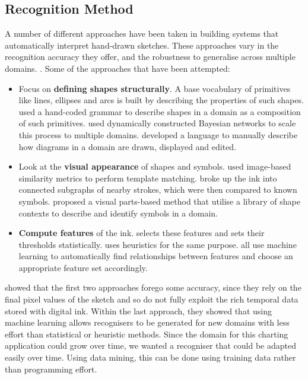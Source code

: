 	\subsection{Recognition Method}
	A number of different approaches have been taken in building systems that automatically interpret hand-drawn sketches. These approaches vary in the recognition accuracy they offer, and the robustness to generalise across multiple domains. \citep{ouyang_visual_2009}. Some of the approaches that have been attempted:
	
	\begin{itemize}
		\item Focus on \textbf{defining shapes structurally}. A base vocabulary of primitives like lines, ellipses and arcs is built by describing the properties of such shapes. \citep{shilman_statistical_2002} used a hand-coded grammar to describe shapes in a domain as a composition of such primitives. \citep{alvarado_sketchread:_2004} used dynamically constructed Bayesian networks to scale this process to multiple domains. \citep{hammond_ladder:_2006} developed a language to manually describe how diagrams in a domain are drawn, displayed and edited. 
		\item Look at the \textbf{visual appearance} of shapes and symbols. \citep{kara_image-based_2004} used image-based similarity metrics to perform template matching. \citep{shilman_recognition_2004} broke up the ink into connected subgraphs of nearby strokes, which were then compared to known symbols. \citep{oltmans_envisioning_2007} proposed a visual parts-based method that utilise a library of shape contexts to describe and identify symbols in a domain.
		\item \textbf{Compute features} of the ink. \citep{patel_ink_2007} selects these features and sets their thresholds statistically. \citep{yu_domain-independent_2003} uses heuristics for the same purpose. \citep{chang_rata._2010,  rubine_specifying_1991, willems_iconic_2009} all use machine learning to automatically find relationships between features and choose an appropriate feature set accordingly.
	\end{itemize}		
	
	\citep{chang_rata._2010} showed that the first two approaches forego some accuracy, since they rely on the final pixel values of the sketch and so do not fully exploit the rich temporal data stored with digital ink. Within the last approach, they showed that using machine learning allows recognisers to be generated for new domains with less effort than statistical or heuristic methods. Since the domain for this charting application could grow over time, we wanted a recogniser that could be adapted easily over time. Using data mining, this can be done using training data rather than programming effort.
	
